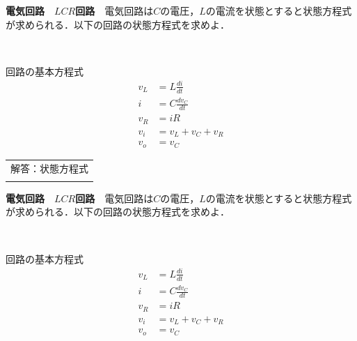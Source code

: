 



\exheader


\noindent
{\bf 電気回路　$LCR$回路}　電気回路は$C$の電圧，$L$の電流を状態とすると状態方程式が求められる．以下の回路の状態方程式を求めよ．

\begin{minipage}{100mm}
\end{minipage}
\begin{minipage}{50mm}
回路の基本方程式
\begin{align*}
	v_L & = L \frac{d i}{dt} \\
	i & = C \frac{d v_C}{dt} \\
	v_R &= i R \\
	v_i & = v_L + v_C + v_R \\
	v_o & = v_C
\end{align*}
\end{minipage}

\vfill

\begin{tabular}{|l|}
\hline
解答：状態方程式\\[3cm]
\hspace*{15cm}\\
\hline
\end{tabular}


\newpage

\noindent
{\bf 電気回路　$LCR$回路}　電気回路は$C$の電圧，$L$の電流を状態とすると状態方程式が求められる．以下の回路の状態方程式を求めよ．

\begin{minipage}{100mm}
\end{minipage}
\begin{minipage}{50mm}
回路の基本方程式
\begin{align*}
	v_L & = L \frac{d i}{dt} \\
	i & = C \frac{d v_C}{dt} \\
	v_R &= i R \\
	v_i & = v_L + v_C + v_R \\
	v_o & = v_C
\end{align*}
\end{minipage}
\ \\[1cm]

